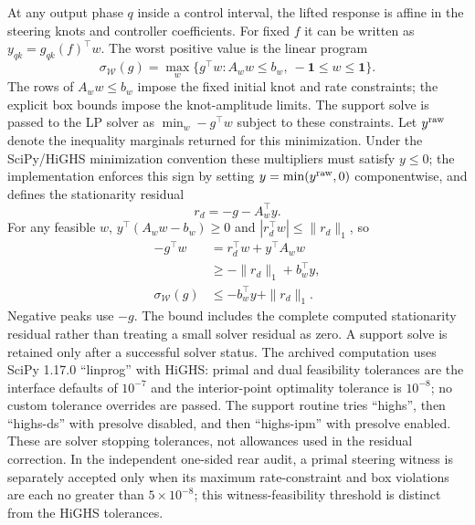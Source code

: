 \documentclass[fleqn,final,5p,times]{elsarticle}
\newcommand{\W}{\mathcal{W}}
\begin{document}
At any output phase $q$ inside a control interval, the lifted response is affine in the steering knots and controller coefficients. For fixed $f$ it can be written as $y_{qk}=g_{qk}(f)^\top w$. The worst positive value is the linear program
\begin{equation}
\sigma_\W(g)=\max_w\{g^\top w:A_ww\le b_w,\ -\mathbf{1}\le w\le\mathbf{1}\}.
\label{eq:support}
\end{equation}
The rows of $A_w w\le b_w$ impose the fixed initial knot and rate constraints; the explicit box bounds impose the knot-amplitude limits. The support solve is passed to the LP solver as $\min_w -g^\top w$ subject to these constraints. Let $y^{\rm raw}$ denote the inequality marginals returned for this minimization. Under the SciPy/HiGHS minimization convention these multipliers must satisfy $y\le0$; the implementation enforces this sign by setting $y=\min(y^{\rm raw},0)$ componentwise, and defines the stationarity residual
\begin{equation}
r_d=-g-A_w^\top y.
\end{equation}
For any feasible $w$, $y^\top(A_w w-b_w)\ge0$ and $|r_d^\top w|\le\|r_d\|_1$, so
\begin{equation}
\begin{aligned}
-g^\top w&=r_d^\top w+y^\top A_w w\\
&\ge -\|r_d\|_1+b_w^\top y,\\
\sigma_\W(g)&\le-b_w^\top y+\|r_d\|_1.
\end{aligned}
\label{eq:support-dual-correction}
\end{equation}
Negative peaks use $-g$. The bound includes the complete computed stationarity residual rather than treating a small solver residual as zero. A support solve is retained only after a successful solver status. The archived computation uses SciPy 1.17.0 ``linprog'' with HiGHS: primal and dual feasibility tolerances are the interface defaults of $10^{-7}$ and the interior-point optimality tolerance is $10^{-8}$; no custom tolerance overrides are passed. The support routine tries ``highs'', then ``highs-ds'' with presolve disabled, and then ``highs-ipm'' with presolve enabled. These are solver stopping tolerances, not allowances used in the residual correction. In the independent one-sided rear audit, a primal steering witness is separately accepted only when its maximum rate-constraint and box violations are each no greater than $5\times10^{-8}$; this witness-feasibility threshold is distinct from the HiGHS tolerances.
\end{document}
